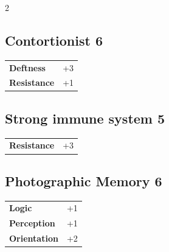 \begin{multicols}{2}
\begin{tcolorbox}
    \subsection*{Contortionist \hfill \small{6 }}
    \tcblower




\begin{tabular}{@{}ll@{}}
    \textbf{Deftness} & +3\\
    \textbf{Resistance} & +1\\
\end{tabular}


\end{tcolorbox}

\begin{tcolorbox}
    \subsection*{Strong immune system \hfill \small{5 }}
    \tcblower




\begin{tabular}{@{}ll@{}}
    \textbf{Resistance} & +3\\
\end{tabular}


\end{tcolorbox}

\begin{tcolorbox}
    \subsection*{Photographic Memory \hfill \small{6 }}
    \tcblower




\begin{tabular}{@{}ll@{}}
    \textbf{Logic} & +1\\
    \textbf{Perception} & +1\\
    \textbf{Orientation} & +2\\
\end{tabular}


\end{tcolorbox}
\end{multicols}
